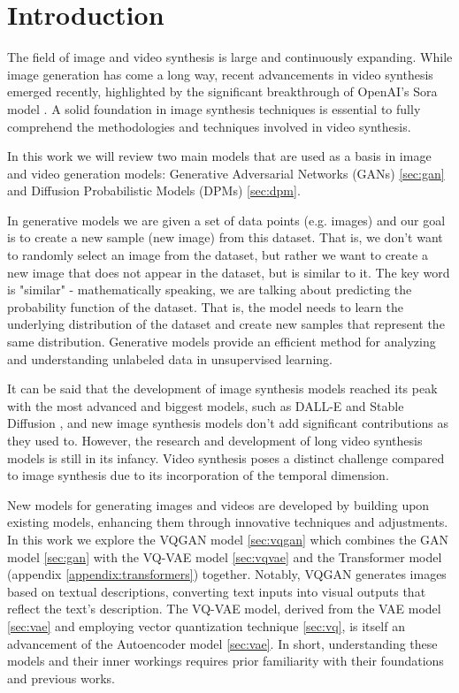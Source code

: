 \section{Introduction}

The field of image and video synthesis is large and continuously expanding. While image generation has come a long way, recent advancements in video synthesis emerged recently, highlighted by the significant breakthrough of OpenAI's Sora model \cite{sora_website}. A solid foundation in image synthesis techniques is essential to fully comprehend the methodologies and techniques involved in video synthesis.

In this work we will review two main models that are used as a basis in image and video generation models: Generative Adversarial Networks (GANs) \cite{gan} \ref{sec:gan} and Diffusion Probabilistic Models (DPMs) \cite{diffusion_models} \cite{ddpm} \ref{sec:dpm}.

In generative models we are given a set of data points (e.g. images) and our goal is to create a new sample (new image) from this dataset. That is, we don't want to randomly select an image from the dataset, but rather we want to create a new image that does not appear in the dataset, but is similar to it. The key word is "similar" - mathematically speaking, we are talking about predicting the probability function of the dataset. That is, the model needs to learn the underlying distribution of the dataset and create new samples that represent the same distribution. Generative models provide an efficient method for analyzing and understanding unlabeled data in unsupervised learning.

It can be said that the development of image synthesis models reached its peak with the most advanced and biggest models, such as DALL-E \cite{dalle} and Stable Diffusion \cite{stable_diffusion}, and new image synthesis models don't add significant contributions as they used to. However, the research and development of long video synthesis models is still in its infancy. Video synthesis poses a distinct challenge compared to image synthesis due to its incorporation of the temporal dimension.

New models for generating images and videos are developed by building upon existing models, enhancing them through innovative techniques and adjustments. In this work we explore the VQGAN model \cite{vqgan} \ref{sec:vqgan} which combines the GAN model \cite{gan} \ref{sec:gan} with the VQ-VAE model \cite{vqvae} \ref{sec:vqvae} and the Transformer model \cite{transformer} (appendix \ref{appendix:transformers}) together. Notably, VQGAN generates images based on textual descriptions, converting text inputs into visual outputs that reflect the text's description. The VQ-VAE model, derived from the VAE model \cite{vae} \ref{sec:vae} and employing vector quantization technique \cite{vqvae} \ref{sec:vq}, is itself an advancement of the Autoencoder model \cite{autoencoder} \ref{sec:vae}. In short, understanding these models and their inner workings requires prior familiarity with their foundations and previous works.

